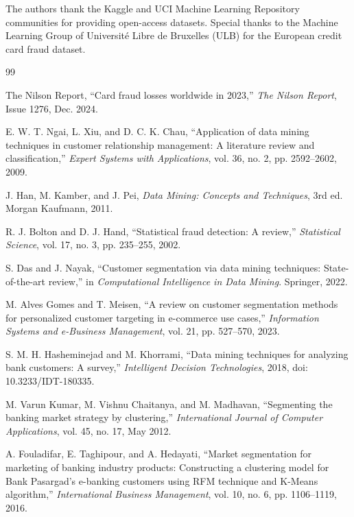 \documentclass[conference]{IEEEtran}
\begin{document}
The authors thank the Kaggle and UCI Machine Learning Repository communities for providing open-access datasets. Special thanks to the Machine Learning Group of Universit\'{e} Libre de Bruxelles (ULB) for the European credit card fraud dataset.

\begin{thebibliography}{99}

The Nilson Report, ``Card fraud losses worldwide in 2023,'' \textit{The Nilson Report}, Issue 1276, Dec. 2024.

E. W. T. Ngai, L. Xiu, and D. C. K. Chau, ``Application of data mining techniques in customer relationship management: A literature review and classification,'' \textit{Expert Systems with Applications}, vol. 36, no. 2, pp. 2592--2602, 2009.

J. Han, M. Kamber, and J. Pei, \textit{Data Mining: Concepts and Techniques}, 3rd ed. Morgan Kaufmann, 2011.

R. J. Bolton and D. J. Hand, ``Statistical fraud detection: A review,'' \textit{Statistical Science}, vol. 17, no. 3, pp. 235--255, 2002.

S. Das and J. Nayak, ``Customer segmentation via data mining techniques: State-of-the-art review,'' in \textit{Computational Intelligence in Data Mining}. Springer, 2022.

M. Alves Gomes and T. Meisen, ``A review on customer segmentation methods for personalized customer targeting in e-commerce use cases,'' \textit{Information Systems and e-Business Management}, vol. 21, pp. 527--570, 2023.

S. M. H. Hasheminejad and M. Khorrami, ``Data mining techniques for analyzing bank customers: A survey,'' \textit{Intelligent Decision Technologies}, 2018, doi: 10.3233/IDT-180335.

M. Varun Kumar, M. Vishnu Chaitanya, and M. Madhavan, ``Segmenting the banking market strategy by clustering,'' \textit{International Journal of Computer Applications}, vol. 45, no. 17, May 2012.

A. Fouladifar, E. Taghipour, and A. Hedayati, ``Market segmentation for marketing of banking industry products: Constructing a clustering model for Bank Pasargad's e-banking customers using RFM technique and K-Means algorithm,'' \textit{International Business Management}, vol. 10, no. 6, pp. 1106--1119, 2016.


\end{thebibliography}
\end{document}
